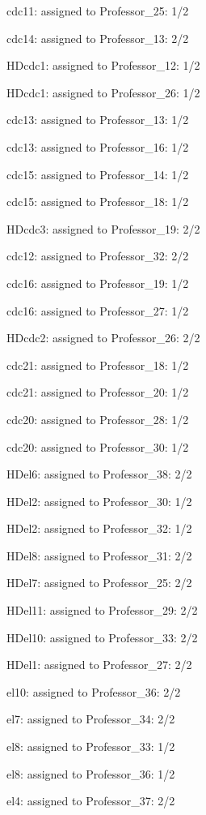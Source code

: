 \documentclass{article} %
\begin{document}
\noindent cdc11: assigned to Professor\_25: 1/2

\noindent cdc14: assigned to Professor\_13: 2/2

\noindent HDcdc1: assigned to Professor\_12: 1/2

\noindent HDcdc1: assigned to Professor\_26: 1/2

\noindent cdc13: assigned to Professor\_13: 1/2

\noindent cdc13: assigned to Professor\_16: 1/2

\noindent cdc15: assigned to Professor\_14: 1/2

\noindent cdc15: assigned to Professor\_18: 1/2

\noindent HDcdc3: assigned to Professor\_19: 2/2

\noindent cdc12: assigned to Professor\_32: 2/2

\noindent cdc16: assigned to Professor\_19: 1/2

\noindent cdc16: assigned to Professor\_27: 1/2

\noindent HDcdc2: assigned to Professor\_26: 2/2

\noindent cdc21: assigned to Professor\_18: 1/2

\noindent cdc21: assigned to Professor\_20: 1/2

\noindent cdc20: assigned to Professor\_28: 1/2

\noindent cdc20: assigned to Professor\_30: 1/2

\noindent HDel6: assigned to Professor\_38: 2/2

\noindent HDel2: assigned to Professor\_30: 1/2

\noindent HDel2: assigned to Professor\_32: 1/2

\noindent HDel8: assigned to Professor\_31: 2/2

\noindent HDel7: assigned to Professor\_25: 2/2

\noindent HDel11: assigned to Professor\_29: 2/2

\noindent HDel10: assigned to Professor\_33: 2/2

\noindent HDel1: assigned to Professor\_27: 2/2

\noindent el10: assigned to Professor\_36: 2/2

\noindent el7: assigned to Professor\_34: 2/2

\noindent el8: assigned to Professor\_33: 1/2

\noindent el8: assigned to Professor\_36: 1/2

\noindent el4: assigned to Professor\_37: 2/2
\end{document}
